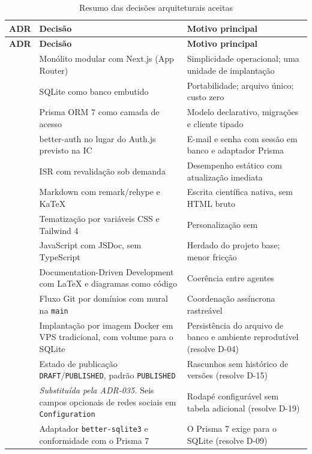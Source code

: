 \begingroup\small\renewcommand{\arraystretch}{1.25}
\begin{longtable}{@{}L{2.0cm}L{5.6cm}L{6.4cm}@{}}
\caption{Resumo das decisões arquiteturais aceitas}\label{tab:resumo-adr}\\
\toprule
\textbf{ADR} & \textbf{Decisão} & \textbf{Motivo principal}\\
\midrule
\endfirsthead
\toprule
\textbf{ADR} & \textbf{Decisão} & \textbf{Motivo principal}\\
\midrule
\endhead
\bottomrule
\endfoot
{} & Monólito modular com Next.js (App Router) & Simplicidade operacional; uma unidade de implantação\\
 & SQLite como banco embutido & Portabilidade; arquivo único; custo zero\\
 & Prisma ORM 7 como camada de acesso & Modelo declarativo, migrações e cliente tipado\\
 & better-auth no lugar do Auth.js previsto na IC & E-mail e senha com sessão em banco e adaptador Prisma\\
 & ISR com revalidação sob demanda & Desempenho estático com atualização imediata\\
 & Markdown com remark/rehype e KaTeX & Escrita científica nativa, sem HTML bruto\\
 & Tematização por variáveis CSS e Tailwind 4 & Personalização sem \\
 & JavaScript com JSDoc, sem TypeScript & Herdado do projeto base; menor fricção\\
 & Documentation-Driven Development com \LaTeX{} e diagramas como código & Coerência entre agentes\\
 & Fluxo Git por domínios com mural na \texttt{main} & Coordenação assíncrona rastreável\\
 & Implantação por imagem Docker em VPS tradicional, com volume para o SQLite & Persistência do arquivo de banco e ambiente reprodutível (resolve D-04)\\
 & Estado de publicação \texttt{DRAFT}/\texttt{PUBLISHED}, padrão \texttt{PUBLISHED} & Rascunhos sem histórico de versões (resolve D-15)\\
 & \emph{Substituída pela ADR-035.} Seis campos opcionais de redes sociais em \texttt{Configuration} & Rodapé configurável sem tabela adicional (resolve D-19)\\
 & Adaptador \texttt{better-sqlite3} e conformidade com o Prisma 7 & O Prisma 7 exige  para o SQLite (resolve D-09)\\

\end{longtable}
